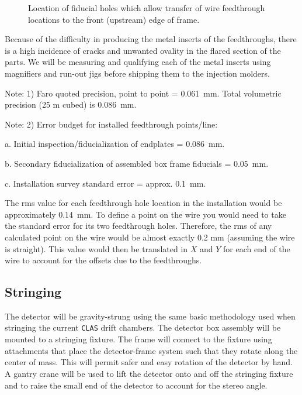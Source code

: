 \documentclass[12pt]{article}
\begin{document}
\begin{figure}[htbp]
\vspace{8.8cm}
\caption{\small{Location of fiducial holes which allow transfer of wire 
feedthrough locations to the front (upstream) edge of frame.}}
\label{holes}
\end{figure}

Because of the difficulty in producing the metal inserts of the feedthroughs, 
there is a high incidence of cracks and unwanted ovality in the flared section 
of the parts. We will be measuring and qualifying each of the metal inserts 
using magnifiers and run-out jigs before shipping them to the injection molders. 


\vskip 0.2cm

\noindent
Note: 1) Faro quoted precision, point to point = 0.061~mm. Total volumetric 
precision (25 m cubed) is 0.086~mm.

\vskip 0.1cm

\noindent
Note: 2) Error budget for installed feedthrough points/line:

\vskip 0.2cm

a. Initial inspection/fiducialization of endplates = 0.086~mm.

b. Secondary fiducialization of assembled box frame fiducials = 0.05~mm.

c. Installation survey standard error = approx. 0.1~mm.

\vskip 0.2cm

The rms value for each feedthrough hole location in the installation 
would be approximately 0.14~mm. To define a point on the wire you would need 
to take the standard error for its two feedthrough holes. Therefore, 
the rms of any calculated point on the wire would be almost exactly 0.2 
mm (assuming the wire is straight). This value would then be translated 
in $X$ and $Y$ for each end of the wire to account for the offsets due to 
the feedthroughs.

\subsection{Stringing}

The detector will be gravity-strung using the same basic methodology 
used when stringing the current {\tt CLAS} drift chambers. The detector box 
assembly will be mounted to a stringing fixture.  The frame will connect 
to the fixture using attachments that place the detector-frame system 
such that they rotate along the center of mass. This will permit safer 
and easy rotation of the detector by hand. A gantry crane will be used 
to lift the detector onto and off the stringing fixture and to raise the 
small end of the detector  to account for the stereo angle.
\end{document}
